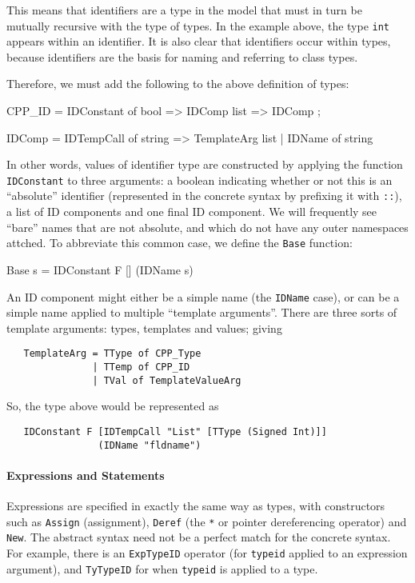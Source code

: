 \documentclass[11pt]{article}
\begin{document}
This means that identifiers are a type in the model that must in turn
be mutually recursive with the type of types.  In the example above,
the type \texttt{int} appears within an identifier.  It is also clear
that identifiers occur within types, because identifiers are the basis
for naming and referring to class types.

Therefore, we must add the following to the above definition of \cpp{}
types:
%
%
%
\begin{stdrule}
   CPP_ID = IDConstant of bool => IDComp list => IDComp ;

   IDComp = IDTempCall of string => TemplateArg list
          | IDName of string
\end{stdrule}
In other words, values of identifier type are constructed by applying
the function \texttt{IDConstant} to three arguments: a boolean
indicating whether or not this is an ``absolute'' identifier
(represented in the concrete syntax by prefixing it with \texttt{::}),
a list of ID components and one final ID component.  We will
frequently see ``bare'' names that are not absolute, and which do not
have any outer namespaces attched.  To abbreviate this common case, we
define the \texttt{Base} function:%
%
%
\begin{stdrule}
   Base s = IDConstant F [] (IDName s)
\end{stdrule}

An ID component might either be a simple name (the \texttt{IDName}
case), or can be a simple name applied to multiple ``template
arguments''.  There are three sorts of template arguments: types,
templates and values; giving
\begin{verbatim}
   TemplateArg = TType of CPP_Type
               | TTemp of CPP_ID
               | TVal of TemplateValueArg
\end{verbatim}
So, the type above would be represented as
\begin{verbatim}
   IDConstant F [IDTempCall "List" [TType (Signed Int)]]
                (IDName "fldname")
\end{verbatim}

\paragraph{Expressions and Statements}

Expressions are specified in exactly the same way as types, with
constructors such as \texttt{Assign} (assignment), \texttt{Deref} (the
\texttt{*} or pointer dereferencing operator) and \texttt{New}.  The
abstract syntax need not be a perfect match for the concrete syntax.
For example, there is an \texttt{ExpTypeID} operator (for
\texttt{typeid} applied to an expression argument), and
\texttt{TyTypeID} for when \texttt{typeid} is applied to a type.
\end{document}

